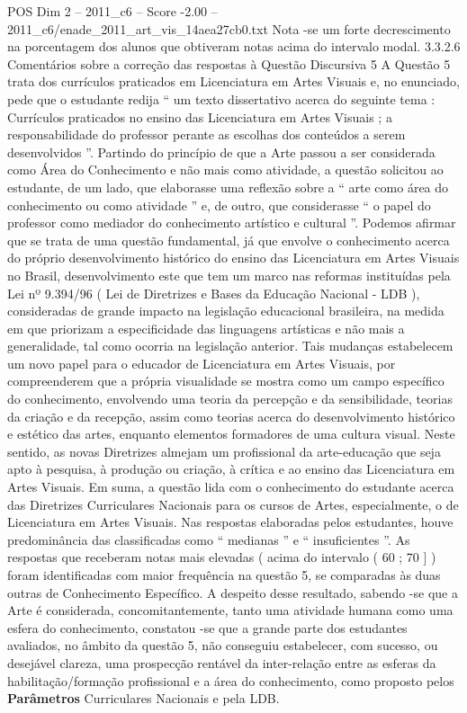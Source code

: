 \begin{textsample}{POS Dim 2 – 2011\_c6 – Score -2.00 – 2011\_c6/enade\_2011\_art\_vis\_14aea27cb0.txt}
Nota -se um forte decrescimento na porcentagem dos alunos que obtiveram notas acima do intervalo modal. 3.3.2.6 Comentários sobre a correção das respostas à Questão Discursiva 5 A Questão 5 trata dos currículos praticados em Licenciatura em Artes Visuais e, no enunciado, pede que o estudante redija “ um texto dissertativo acerca do seguinte tema : Currículos praticados no ensino das Licenciatura em Artes Visuais ; a responsabilidade do professor perante as escolhas dos conteúdos a serem desenvolvidos ”.
Partindo do princípio de que a Arte passou a ser considerada como Área do Conhecimento e não mais como atividade, a questão solicitou ao estudante, de um lado, que elaborasse uma reflexão sobre a “ arte como área do conhecimento ou como atividade ” e, de outro, que considerasse “ o papel do professor como mediador do conhecimento artístico e cultural ”.
Podemos afirmar que se trata de uma questão fundamental, já que envolve o conhecimento acerca do próprio desenvolvimento histórico do ensino das Licenciatura em Artes Visuais no Brasil, desenvolvimento este que tem um marco nas reformas instituídas pela Lei nº 9.394/96 ( Lei de Diretrizes e Bases da Educação Nacional - LDB ), consideradas de grande impacto na legislação educacional brasileira, na medida em que priorizam a especificidade das linguagens artísticas e não mais a generalidade, tal como ocorria na legislação anterior.
Tais mudanças estabelecem um novo papel para o educador de Licenciatura em Artes Visuais, por compreenderem que a própria visualidade se mostra como um campo específico do conhecimento, envolvendo uma teoria da percepção e da sensibilidade, teorias da criação e da recepção, assim como teorias acerca do desenvolvimento histórico e estético das artes, enquanto elementos formadores de uma cultura visual.
Neste sentido, as novas Diretrizes almejam um profissional da arte-educação que seja apto à pesquisa, à produção ou criação, à crítica e ao ensino das Licenciatura em Artes Visuais.
Em suma, a questão lida com o conhecimento do estudante acerca das Diretrizes Curriculares Nacionais para os cursos de Artes, especialmente, o de Licenciatura em Artes Visuais.
Nas respostas elaboradas pelos estudantes, houve predominância das classificadas como “ medianas ” e “ insuficientes ”.
As respostas que receberam notas mais elevadas ( acima do intervalo ( 60 ; 70 ] ) foram identificadas com maior frequência na questão 5, se comparadas às duas outras de Conhecimento Específico.
A despeito desse resultado, sabendo -se que a Arte é considerada, concomitantemente, tanto uma atividade humana como uma esfera do conhecimento, constatou -se que a grande parte dos estudantes avaliados, no âmbito da questão 5, não conseguiu estabelecer, com sucesso, ou desejável clareza, uma prospecção rentável da inter-relação entre as esferas da habilitação/formação profissional e a área do conhecimento, como proposto pelos \textbf{Parâmetros} Curriculares Nacionais e pela LDB.

\end{textsample}
